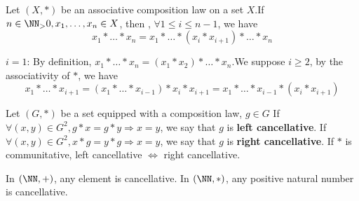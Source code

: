\begin{propositionenv}
    Let $(X, *)$ be an associative composition law on a set $X$.If $n\in \NN_>0, x_1, \dots, x_n\in X$,  then ,  $\forall 1\le i\le n-1$,  we have 
    $$x_1*\dots *x_n=x_1*\dots *(x_i*x_{i+1})*\dots *x_n$$
\end{propositionenv}
\begin{proofenv}
    \quad
    \newline
    $i=1$: By definition, $x_1*\dots *x_n=(x_1*x_2)*\dots *x_n$.We suppose $i\geq 2 $,  by the associativity of $*$,  we have
    $$x_1*\dots *x_{i+1}=(x_1*\dots *x_{i-1})*x_i*x_{i+1}=x_1*\dots *x_{i-1}*(x_i*x_{i+1})$$ 
\end{proofenv}
\begin{definitionenv}
    Let $(G, *)$ be a set equipped with a composition law, $g\in G$
    \newline
    If $\forall (x, y)\in G^2, g*x=g*y\Rightarrow x=y$, we say that $g$ is \textbf{left cancellative}.
    \newline
    If $\forall (x, y)\in G^2, x*g=y*g\Rightarrow x=y$, we say that $g$ is \textbf{right cancellative}.
    \newline
    If $*$ is communitative,  left cancellative $\Leftrightarrow$ right cancellative.
\end{definitionenv}
\begin{exampleenv}
    \quad
    \newline
    In $(\NN, +)$,  any element is cancellative.
    \newline
    In $(\NN, *)$,  any positive natural number is cancellative.

\end{exampleenv}
